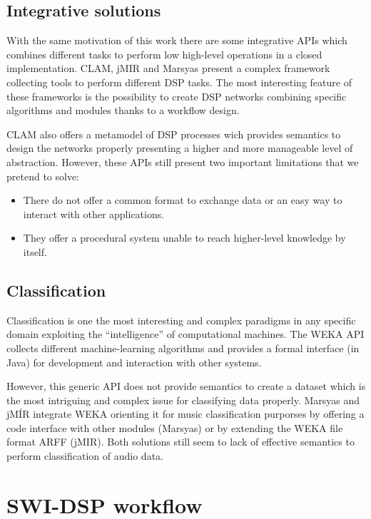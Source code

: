 \documentclass[runningheads]{llncs}
\begin{document}
\subsection{Integrative solutions}\label{subsec:inte}

With the same motivation of this work there are some integrative APIs which combines different tasks to perform low high-level operations in a closed implementation. CLAM, jMIR and Marsyas present a complex framework collecting tools to perform different DSP tasks. The most interesting feature of these frameworks is the possibility to create DSP networks combining specific algorithms and modules thanks to a workflow design.

CLAM also offers a metamodel of DSP processes wich provides semantics to design the networks properly presenting a higher and more manageable level of abstraction. However, these APIs still present two important limitations that we pretend to solve:

\begin{itemize}
 \item There do not offer a common format to exchange data or an easy way to interact with other applications.
 \item They offer a procedural system unable to reach higher-level knowledge by itself.
\end{itemize}

\subsection{Classification}\label{subsec:classif}

Classification is one the most interesting and complex paradigms in any specific domain exploiting the ``intelligence'' of computational machines. The WEKA API collects different machine-learning algorithms and provides a formal interface (in Java) for development and interaction with other systems.

However, this generic API does not provide semantics to create a dataset which is the most intriguing and complex issue for classifying data properly. Marsyas and jMÍR integrate WEKA orienting it for music classification purporses by offering a code interface with other modules (Marsyas) or by extending the WEKA file format ARFF (jMIR). Both solutions still seem to lack of effective semantics to perform classification of audio data.

\section{SWI-DSP workflow}\label{sec:dspworkflow}
\end{document}
